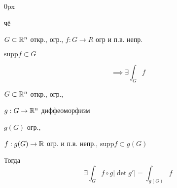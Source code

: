 
\parindent 0px



\usepackage{amsfonts, amssymb, amsmath, mathtools, amsthm}  %
\usepackage{mathrsfs}


чё

$G \subset \mathbb{R}^n $ откр., огр., $f: G \to R$ огр и п.в. непр.

$\text{supp} f \subset G$

$$\implies \exists \int_G f$$

\begin{theorem}
    $G \subset \mathbb{R}^n$ откр., огр., 
    
    $g: G \to \mathbb{R}^n$ диффеоморфизм
    
    $g(G)$ огр., 

    $f: g(G) \to \mathbb{R}$ огр. и п.в. непр., $\text{supp}f \subset g(G)$

    Тогда $$\exists \int_G f\circ g | \det g' | = \int_{g(G)}f$$
\end{theorem}

